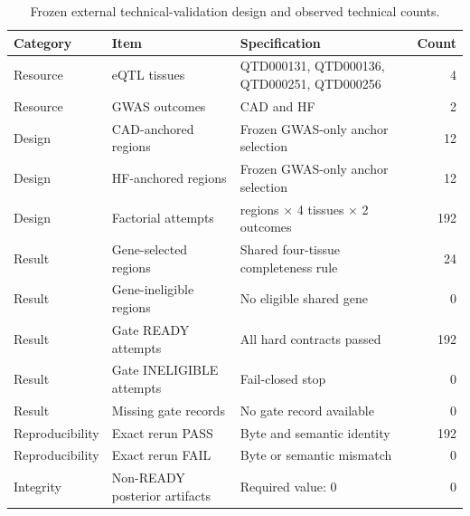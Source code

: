 \begin{table}[t]
\centering
\caption{Frozen external technical-validation design and observed technical counts.}
\label{tab:external_validation_summary}
\begin{tabularx}{\textwidth}{@{}llXr@{}}
\toprule
Category & Item & Specification & Count \\
\midrule
Resource & eQTL tissues & QTD000131, QTD000136, QTD000251, QTD000256 & 4 \\
Resource & GWAS outcomes & CAD and HF & 2 \\
Design & CAD-anchored regions & Frozen GWAS-only anchor selection & 12 \\
Design & HF-anchored regions & Frozen GWAS-only anchor selection & 12 \\
Design & Factorial attempts & regions × 4 tissues × 2 outcomes & 192 \\
Result & Gene-selected regions & Shared four-tissue completeness rule & 24 \\
Result & Gene-ineligible regions & No eligible shared gene & 0 \\
Result & Gate READY attempts & All hard contracts passed & 192 \\
Result & Gate INELIGIBLE attempts & Fail-closed stop & 0 \\
Result & Missing gate records & No gate record available & 0 \\
Reproducibility & Exact rerun PASS & Byte and semantic identity & 192 \\
Reproducibility & Exact rerun FAIL & Byte or semantic mismatch & 0 \\
Integrity & Non-READY posterior artifacts & Required value: 0 & 0 \\
\bottomrule
\end{tabularx}
\end{table}
